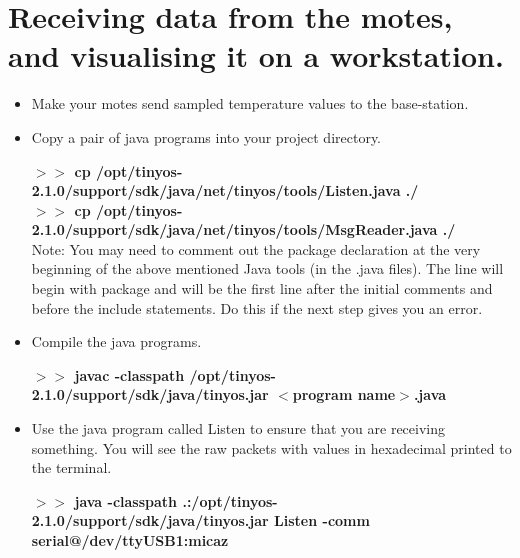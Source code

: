 \documentclass [a4] {article}
\begin{document}
\section{Receiving data from the motes, and visualising it on a workstation.}

\begin{itemize}
\item Make your motes send sampled temperature values to the base-station.

\item Copy a pair of java programs into your project directory.

\textbf{$>>$ cp /opt/tinyos-2.1.0/support/sdk/java/net/tinyos/tools/Listen.java ./} \\
\textbf{$>>$ cp /opt/tinyos-2.1.0/support/sdk/java/net/tinyos/tools/MsgReader.java ./} \\


Note: You may need to comment out the package declaration at the very beginning of the above mentioned Java tools (in the .java files). The line will begin with package and will be the first line after the initial comments and before the include statements. Do this if the next step gives you an error.

\item Compile the java programs. 

\textbf{$>>$ javac -classpath /opt/tinyos-2.1.0/support/sdk/java/tinyos.jar $<$program name$>$.java} \\


\item Use the java program called Listen to ensure that you are receiving something. You will see the raw packets with values in hexadecimal printed to the terminal.


\textbf{$>>$ java -classpath .:/opt/tinyos-2.1.0/support/sdk/java/tinyos.jar Listen -comm serial@/dev/ttyUSB1:micaz} \\



\end{itemize}
\end{document}
